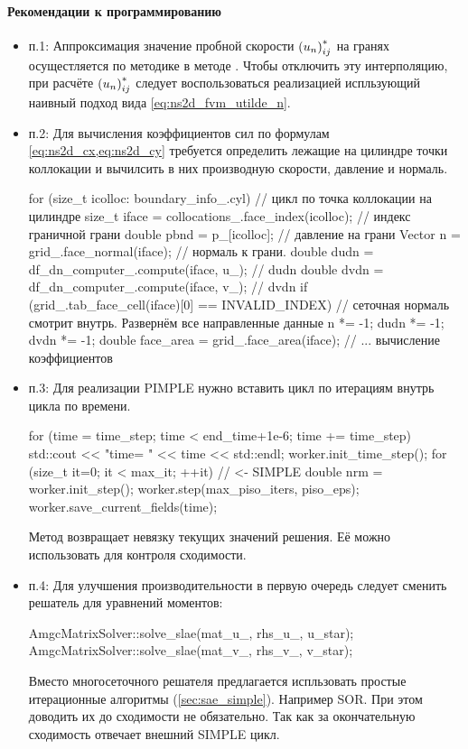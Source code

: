 \paragraph{Рекомендации к программированию}
\begin{itemize}
\item п.1: Аппроксимация значение пробной скорости $\left(u_n\right)_{ij}^*$ на гранях
осущестляется по методике 
в методе .
Чтобы отключить эту интерполяцию, при расчёте $\left(u_n\right)_{ij}^*$
следует воспользоваться реализацией
испльзующий наивный подход вида \cref{eq:ns2d_fvm_utilde_n}.

\item п.2: Для вычисления коэффициентов сил по формулам \cref{eq:ns2d_cx,eq:ns2d_cy}
           требуется определить лежащие на цилиндре точки коллокации и вычилсить в них производную скорости, давление и нормаль.
\begin{cppcode}
for (size_t icolloc: boundary_info_.cyl){   // цикл по точка коллокации на цилиндре
    size_t iface = collocations_.face_index(icolloc);  // индекс граничной грани
    double pbnd = p_[icolloc]; // давление на грани
    Vector n = grid_.face_normal(iface); // нормаль к грани.
    double dudn = df_dn_computer_.compute(iface, u_); // dudn
    double dvdn = df_dn_computer_.compute(iface, v_); // dvdn
    if (grid_.tab_face_cell(iface)[0] == INVALID_INDEX){
        // сеточная нормаль смотрит внутрь. Развернём все направленные данные
        n *= -1;
        dudn *= -1;
        dvdn *= -1;
    }
    double face_area = grid_.face_area(iface);
    // ... вычисление коэффициентов
}
\end{cppcode}
\item п.3: Для реализации PIMPLE нужно вставить цикл по итерациям внутрь цикла по времени.
\begin{cppcode}
    for (time = time_step; time < end_time+1e-6; time += time_step){
        std::cout << "time= " << time << std::endl;
        worker.init_time_step();
        for (size_t it=0; it < max_it; ++it){    // <- SIMPLE
            double nrm = worker.init_step();
            worker.step(max_piso_iters, piso_eps);
        }
        worker.save_current_fields(time);
    }
\end{cppcode}
Метод  возвращает невязку текущих значений решения. Её можно
использовать для контроля сходимости.

\item п.4: Для улучшения производительности в первую очередь следует сменить решатель
           для уравнений моментов:
\begin{cppcode}
AmgcMatrixSolver::solve_slae(mat_u_, rhs_u_, u_star);
AmgcMatrixSolver::solve_slae(mat_v_, rhs_v_, v_star);
\end{cppcode}
           Вместо многосеточного решателя предлагается испльзовать простые
           итерационные алгоритмы (\cref{sec:sae_simple}). Например SOR.
           При этом доводить их до сходимости не обязательно. Так как за окончательную сходимость отвечает внешний SIMPLE цикл.


\end{itemize}
